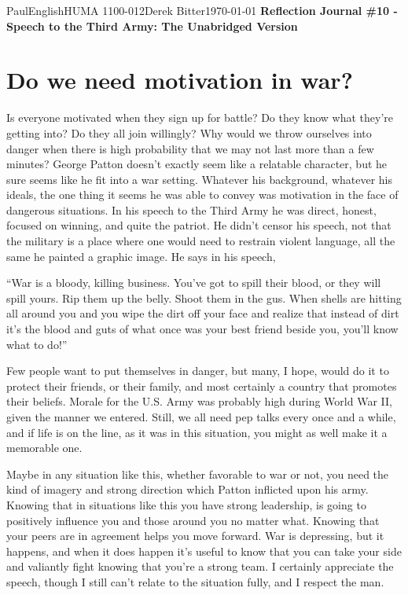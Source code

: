 \documentclass[12pt,letterpaper]{article}
\begin{document}
\begin{mla}{Paul}{English}{HUMA 1100-012}{Derek
    Bitter}{\today}    
    {\textbf{Reflection Journal \#10 - Speech to the Third Army: The Unabridged Version}}

\section*{Do we need motivation in war?}

Is everyone motivated when they sign up for battle? Do they know what they're getting into? Do they all join willingly? Why would we throw ourselves into danger when there is high probability that we may not last more than a few minutes? George Patton doesn't exactly seem like a relatable character, but he sure seems like he fit into a war setting. Whatever his background, whatever his ideals, the one thing it seems he was able to convey was motivation in the face of dangerous situations. In his speech to the Third Army he was direct, honest, focused on winning, and quite the patriot. He didn't censor his speech, not that the military is a place where one would need to restrain violent language, all the same he painted a graphic image. He says in his speech,

\begin{blocks}
``War is a bloody, killing business. You've got to spill their blood,
or they will spill yours. Rip them up the belly. Shoot them in the
gus. When shells are hitting all around you and you wipe the dirt off
your face and realize that instead of dirt it's the blood and guts of
what once was your best friend beside you, you'll know what to do!''
\end{blocks}

Few people want to put themselves in danger, but many, I hope, would do it to protect their friends, or their family, and most certainly a country that promotes their beliefs. Morale for the U.S. Army was probably high during World War II, given the manner we entered. Still, we all need pep talks every once and a while, and if life is on the line, as it was in this situation, you might as well make it a memorable one.

Maybe in any situation like this, whether favorable to war or not, you need the kind of imagery and strong direction which Patton inflicted upon his army. Knowing that in situations like this you have strong leadership, is going to positively influence you and those around you no matter what. Knowing that your peers are in agreement helps you move forward. War is depressing, but it happens, and when it does happen it's useful to know that you can take your side and valiantly fight knowing that you're a strong team. I certainly appreciate the speech, though I still can't relate to the situation fully, and I respect the man.

\end{mla}
\end{document}
